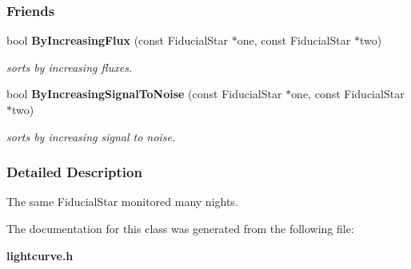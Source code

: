 \subsubsection*{Friends}
\begin{CompactItemize}
\item 
{}
bool {\bf By\-Increasing\-Flux} (const Fiducial\-Star $\ast$one, const Fiducial\-Star $\ast$two)\label{class_lightcurve_l0}

\begin{CompactList}\small\item\em sorts by increasing fluxes.\item\end{CompactList}\item 
{}
bool {\bf By\-Increasing\-Signal\-To\-Noise} (const Fiducial\-Star $\ast$one, const Fiducial\-Star $\ast$two)\label{class_lightcurve_l1}

\begin{CompactList}\small\item\em sorts by increasing signal to noise.\item\end{CompactList}\end{CompactItemize}


\subsubsection{Detailed Description}
The same Fiducial\-Star monitored many nights.



The documentation for this class was generated from the following file:\begin{CompactItemize}
\item 
{\bf lightcurve.h}\end{CompactItemize}
